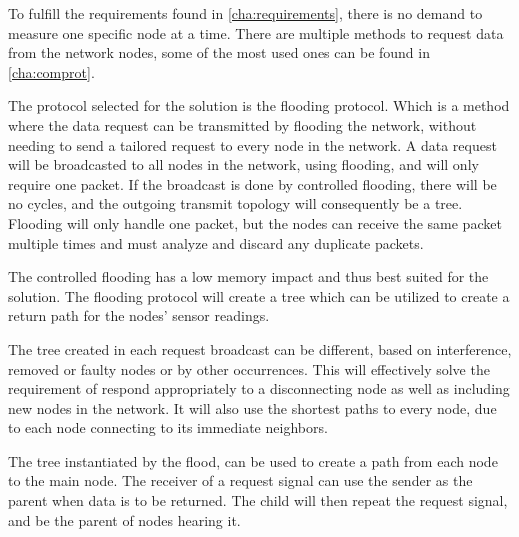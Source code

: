 To fulfill the requirements found in \ref{cha:requirements}, there is no demand to measure one specific node at a time.
There are multiple methods to request data from the network nodes, some of the most used ones can be found in \ref{cha:comprot}. 

The protocol selected for the solution is the flooding protocol.
Which is a method where the data request can be transmitted by flooding the network, without needing to send a tailored request to every node in the network. 
A data request will be broadcasted to all nodes in the network, using flooding, and will only require one packet. 
If the broadcast is done by controlled flooding, there will be no cycles, and the outgoing transmit topology will consequently be a tree. 
Flooding will only handle one packet, but the nodes can receive the same packet multiple times and must analyze and discard any duplicate packets.

The controlled flooding has a low memory impact and thus best suited for the solution. The flooding protocol will create a tree which can be utilized to create a return path for the nodes' sensor readings.

The tree created in each request broadcast can be different, based on interference, removed or faulty nodes or by other occurrences. 
This will effectively solve the requirement of respond appropriately to a disconnecting node as well as including new nodes in the network. 
It will also use the shortest paths to every node, due to each node connecting to its immediate neighbors. 

The tree instantiated by the flood, can be used to create a path from each node to the main node.
The receiver of a request signal can use the sender as the parent when data is to be returned.
The child will then repeat the request signal, and be the parent of nodes hearing it.

